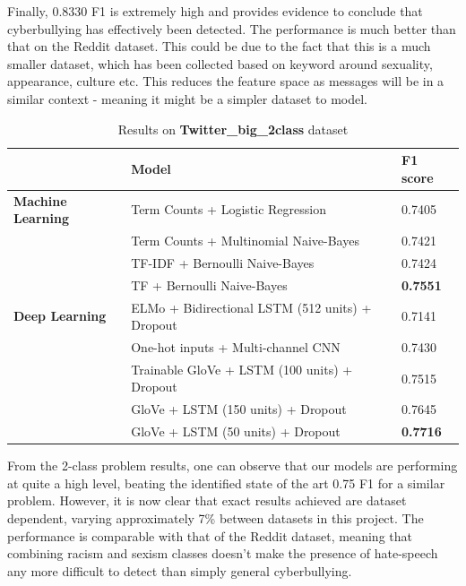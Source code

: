 \documentclass[12pt,a4paper]{article}
\begin{document}
Finally, 0.8330 F1 is extremely high and provides evidence to conclude that cyberbullying has effectively been detected. The performance is much better than that on the Reddit dataset. This could be due to the fact that this is a much smaller dataset, which has been collected based on keyword around sexuality, appearance, culture etc. This reduces the feature space as messages will be in a similar context - meaning it might be a simpler dataset to model.


\begin{table}[H]
	\centering
	\vspace*{-12pt}
	\caption{Results on \textbf{Twitter\_big\_2class} dataset}
	\label{results3}
	\hspace*{-0.8cm}
	\begin{tabular}{p{3.4cm} p{11cm} p{2cm}} \hline\hline
		& \textbf{Model} & \textbf{F1 score}  \\ \hline
		
		\textbf{Machine Learning} & Term Counts + Logistic Regression & 0.7405  \\
		& Term Counts + Multinomial Naive-Bayes & 0.7421  \\
		& TF-IDF + Bernoulli Naive-Bayes & 0.7424  \\
		& TF + Bernoulli Naive-Bayes & \textbf{0.7551} \\ \hline
		
		\textbf{Deep Learning} & ELMo + Bidirectional LSTM (512 units) + Dropout & 0.7141 \\
		&  One-hot inputs + Multi-channel CNN & 0.7430 \\
		&  Trainable GloVe + LSTM (100 units) + Dropout & 0.7515  \\  
		&  GloVe + LSTM (150 units) + Dropout & 0.7645  \\
		&  GloVe + LSTM (50 units) + Dropout & \textbf{0.7716} \\ \hline
	\end{tabular}
\end{table}

From the 2-class problem results, one can observe that our models are performing at quite a high level, beating the identified state of the art 0.75 F1 \cite{Hack} for a similar problem. However, it is now clear that exact results achieved are dataset dependent, varying approximately 7\% between datasets in this project. The performance is comparable with that of the Reddit dataset, meaning that combining racism and sexism classes doesn't make the presence of hate-speech any more difficult to detect than simply general cyberbullying.
\end{document}

